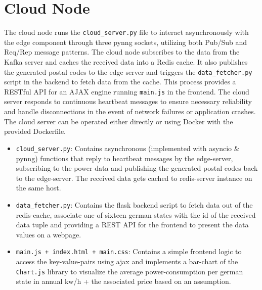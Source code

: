 \documentclass[a4paper]{article}
\begin{document}
\section{Cloud Node}

The cloud node runs the \texttt{cloud\_server.py} file to interact
asynchronously with the edge component through three pynng sockets, utilizing
both Pub/Sub and Req/Rep message patterns. The cloud node subscribes to the data
from the Kafka server and caches the received data into a Redis cache. It also
publishes the generated postal codes to the edge server and triggers the
\texttt{data\_fetcher.py} script in the backend to fetch data from the cache.
This process provides a RESTful API for an AJAX engine running \texttt{main.js}
in the frontend. The cloud server responds to continuous heartbeat messages to
ensure necessary reliability and handle disconnections in the event of network
failures or application crashes. The cloud server can be operated either
directly or using Docker with the provided Dockerfile.

\begin{itemize}

    \item \texttt{cloud\_server.py}: Contains asynchronous (implemented with
        asyncio \& pynng) functions that reply to heartbeat messages by the
        edge-server, subscribing to the power data and publishing the generated
        postal codes back to the edge-server. The received data gets cached to
        redis-server instance on the same host.

    \item \texttt{data\_fetcher.py}: Contains the flask backend script to fetch
        data out of the redis-cache, associate one of sixteen german states with
        the id of the received data tuple and providing a REST API for the
        frontend to present the data values on a webpage.

    \item \texttt{main.js + index.html + main.css}: Contains a simple frontend
        logic to access the key-value-pairs using ajax and implements a
        bar-chart of the \texttt{Chart.js} library to visualize the average
        power-consumption per german state in annual kw/h + the associated price
        based on an assumption.

\end{itemize}



\end{document}
